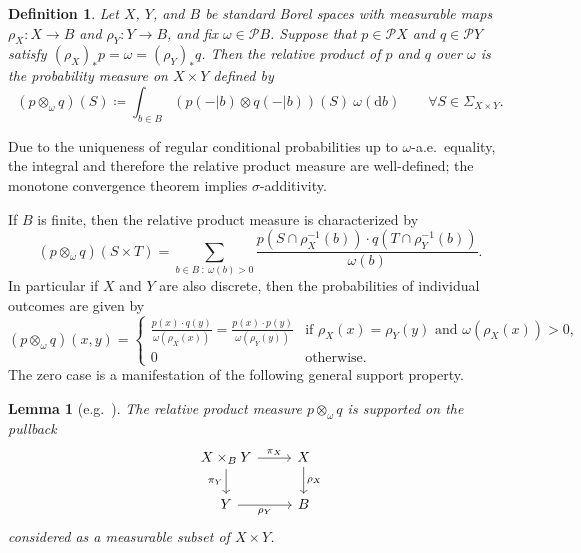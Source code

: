 \documentclass[11pt,a4paper]{scrartcl}
\newcommand{\dx}{\mathrm{d}}
\newcommand{\giry}{\mathcal{P}}
\newtheorem{defi}[theo]{Definition}
\newtheorem{lem}[theo]{Lemma}
\theoremstyle{definition}
\begin{document}
\begin{defi}
  Let $X$, $Y$, and $B$ be standard Borel spaces with measurable maps $\rho_X : X \rightarrow B$ and $\rho_Y : Y \rightarrow B$,
	and fix $\omega \in \giry B$.
	Suppose that $p \in \giry X$ and $q \in \giry Y$ satisfy $(\rho_X)_\ast p = \omega = (\rho_Y)_\ast q$.
	Then the \emph{relative product} of $p$ and $q$ over $\omega$ is the probability measure on $X \times Y$ defined by
  \begin{equation}
		\label{eq:relativeproductmeasure}
		(p \otimes_\omega q)(S) \coloneqq \int_{b \in B} \left(p(-|b) \otimes q(-|b)\right)(S) \ \omega(\dx b)
		\qquad
		\forall S \in \Sigma_{X \times Y}.
  \end{equation}
\end{defi}

Due to the uniqueness of regular conditional probabilities up to $\omega$-a.e.~equality, the integral and therefore the relative product measure are well-defined;
the monotone convergence theorem implies $\sigma$-additivity.

If $B$ is finite, then the relative product measure is characterized by
\[
	(p \otimes_\omega q)(S \times T) = \sum_{b \in B \: : \: \omega(b) > 0} \frac{p(S \cap \rho_X^{-1}(b)) \cdot q(T \cap \rho_Y^{-1}(b))}{\omega(b)}.
\]
In particular if $X$ and $Y$ are also discrete, then the probabilities of individual outcomes are given by
\[
	(p \otimes_\omega q)(x,y) = \begin{cases}
		\frac{p(x) \cdot q(y)}{\omega(\rho_X(x))} = \frac{p(x) \cdot p(y)}{\omega(\rho_Y(y))} & \text{if } \rho_X(x) = \rho_Y(y) \text{ and } \omega(\rho_X(x)) > 0, \\
		0 & \text{otherwise.}
	\end{cases}
\]
The zero case is a manifestation of the following general support property.

\begin{lem}[{e.g.~\cite[Prop.~6.16(1)]{Einsiedler2011}}]
	\label{lem:relativeproductsupport}
	The relative product measure $p \otimes_\omega q$ is supported on the pullback
	\begin{equation}
		\label{eq:pullbackdiagram2}
		\begin{tikzcd}
			X \times_B Y \arrow[r, "\pi_X"] \arrow[d, "\pi_Y"'] & X \arrow[d, "\rho_X"] \\
			Y \arrow[r, "\rho_Y"'] & B
		\end{tikzcd}
	\end{equation}
	considered as a measurable subset of $X \times Y$.
\end{lem}
\end{document}
